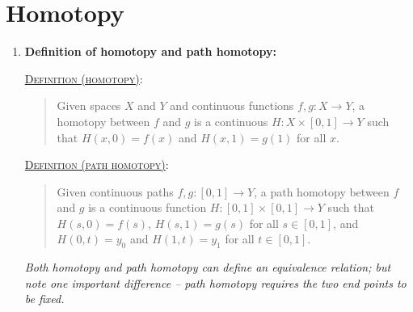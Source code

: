 \documentclass[letterpaper, 12pt]{book}
\newcommand{\defn}[2]{\textsc{\underline{Definition (#1)}:}\begin{quote} #2\end{quote}}
\begin{document}
\section{Homotopy}
    \begin{enumerate}[resume]
    \item \textbf{Definition of homotopy and path homotopy:}

        \defn{homotopy}{Given spaces $X$ and $Y$ and continuous functions $f,g:X\to Y$, a homotopy between $f$ and $g$ is a continuous $H:X\times[0,1]\to Y$ such that $H(x,0) = f(x)$ and $H(x,1) = g(1)$ for all $x$.}

        \defn{path homotopy}{Given continuous paths $f,g:[0,1]\to Y$, a path homotopy between $f$ and $g$ is a continuous function $H:[0,1]\times[0,1]\to Y$ such that $H(s,0) = f(s)$, $H(s,1) = g(s)$ for all $s\in[0,1]$, and $H(0,t) = y_0$ and $H(1,t) = y_1$ for all $t\in[0,1]$.}

        \textit{Both homotopy and path homotopy can define an equivalence relation; but note one important difference -- path homotopy requires the two end points to be fixed.}
    \end{enumerate}
\end{document}
